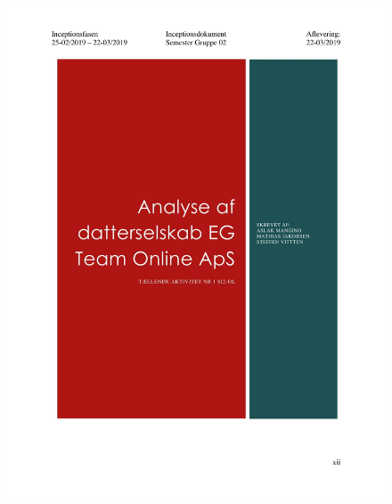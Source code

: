 \begin{figure}[hb]
  \includegraphics[scale = 0.33]{./PNG/Inceptions/Gruppe 02 + InceptionsDokument-45.jpg} 
\end{figure}

